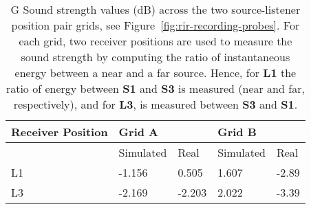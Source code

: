 \begin{table}[htbp]
    \centering
    \caption[Ray tracing testing --- sound strength computed across source-listener positions]{G Sound strength values (dB) across the two source-listener position pair grids, see Figure~\ref{fig:rir-recording-probes}. For each grid, two receiver positions are used to measure the sound strength by computing the ratio of instantaneous energy between a near and a far source. Hence, for \textbf{L1} the ratio of energy between \textbf{S1} and \textbf{S3} is measured (near and far, respectively), and for \textbf{L3}, is measured between \textbf{S3} and  \textbf{S1}.}\label{tab:g-scores}
    \begin{tabular}{@{}lllll@{}}
    \toprule
    Receiver Position & \multicolumn{2}{l}{Grid A} & \multicolumn{2}{l}{Grid B} \\ \midrule
                      & Simulated     & Real       & Simulated      & Real      \\
    L1                & -1.156        & 0.505      & 1.607          & -2.89     \\
    L3                & -2.169        & -2.203     & 2.022          & -3.39     \\ \bottomrule
    \end{tabular}%
\end{table}